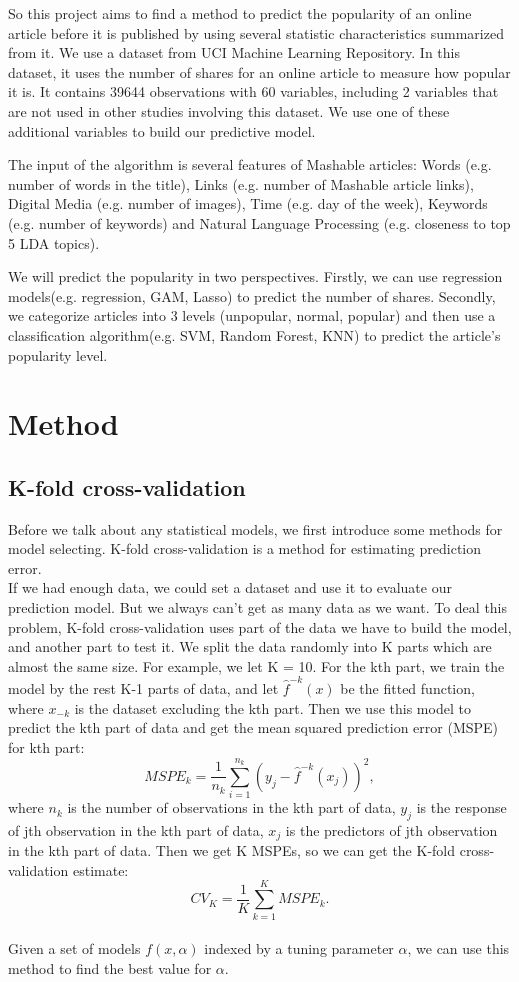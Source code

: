 \documentclass[12pt]{article}
\begin{document}
So this project aims to find a method to predict the popularity of an online article before it is published by using several statistic characteristics summarized from it. We use a dataset from UCI Machine Learning Repository. In this dataset, it uses the number of shares for an online article to measure how popular it is. It contains 39644 observations with 60 variables, including 2 variables that are not used in other studies involving this dataset. We use one of these additional variables to build our predictive model. 

The input of the algorithm is several features of Mashable articles: Words (e.g. number of words in the title), Links (e.g. number of Mashable article links), Digital Media (e.g. number of images), Time (e.g. day of the week), Keywords (e.g. number of keywords) and Natural Language Processing (e.g. closeness to top 5 LDA topics). \cite{fernandes2015proactive}

We will predict the popularity in two perspectives. Firstly, we can use regression models(e.g. regression, GAM, Lasso) to predict the number of shares. Secondly, we categorize articles into 3 levels (unpopular, normal, popular) and then use a classification algorithm(e.g. SVM, Random Forest, KNN) to predict the article's popularity level.  

\newpage
\section{Method}
\subsection{K-fold cross-validation} 
Before we talk about any statistical models, we first introduce some methods for model selecting. K-fold cross-validation is a method for estimating prediction error. \\
If we had enough data, we could set a dataset and use it to evaluate our prediction model. But we always can't get as many data as we want. To deal this problem, K-fold cross-validation uses part of the data we have to build the model, and another part to test it. We split the data randomly into K parts which are almost the same size. For example, we let K = 10. For the kth part, we train the model by the rest K-1 parts of data, and let $\hat{f}^{-k}(x)$ be the fitted function, where $x_{-k}$ is the dataset excluding the kth part. Then we use this model to predict the kth part of data and get the mean squared prediction error (MSPE) for kth part:$$MSPE_k = \frac{1}{n_k} \sum_{i=1}^{n_k} (y_j - \hat{f}^{-k}(x_j))^2,$$ where $n_k$ is the number of observations in the kth part of data, $y_j$ is the response of jth observation in the kth part of data, $x_j$ is the predictors of jth observation in the kth part of data. Then we get K MSPEs, so we can get the K-fold cross-validation estimate: $$CV_{K} = \frac{1}{K} \sum_{k=1}^{K} MSPE_k.$$ \\
Given a set of models $f(x, \alpha)$ indexed by a tuning parameter $\alpha$, we can use this method to find the best value for $\alpha$. \cite[p.241-245]{friedman2001elements}
\end{document}
